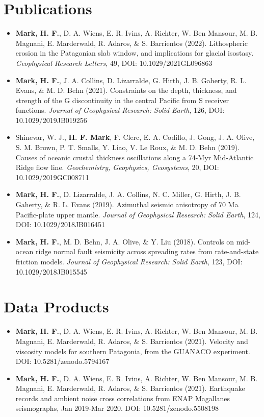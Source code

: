 \documentclass[letterpaper,11pt]{article}
\newlength\listindent
\newcommand{\resumeCite}[6]{
  \vspace{-2pt}\item 
    #1 (#2). #3. \textit{#4}, #5, DOI: #6
  \vspace{-5pt}
}
\newcommand{\resumeDataset}[4]{
  \vspace{-2pt}\item 
    #1 (#2). #3. DOI: #4
  \vspace{-5pt}
}
\newcommand{\resumeSubHeadingListStart}{\begin{itemize}[leftmargin=0.15in, label={}]}
\newcommand{\resumeSubHeadingListEnd}{\end{itemize}}
\begin{document}
\section{Publications}
    \resumeSubHeadingListStart
     0cm \linewidth \listindent \dimexpr\linewidth-\listindent\relax
    \resumeCite
    {\textbf{Mark, H. F.}, D. A. Wiens, E. R. Ivins, A. Richter, W. Ben Mansour, M. B. Magnani, E. Marderwald, R. Adaros, \& S. Barrientos}{2022}{Lithospheric erosion in the Patagonian slab window, and implications for glacial isostasy}{Geophysical Research Letters}{49}{10.1029/2021GL096863}
    \resumeCite
    {\textbf{Mark, H. F.}, J. A. Collins, D. Lizarralde, G. Hirth, J. B. Gaherty, R. L. Evans, \& M. D. Behn}{2021}{Constraints on the depth, thickness, and strength of the G discontinuity in the central Pacific from S receiver functions}{Journal of Geophysical Research: Solid Earth}{126}{10.1029/2019JB019256}
    \resumeCite
    {Shinevar, W. J., \textbf{H. F. Mark}, F. Clerc, E. A. Codillo, J. Gong, J. A. Olive, S. M. Brown, P. T. Smalls, Y. Liao, V. Le Roux, \& M. D. Behn}{2019}{Causes of oceanic crustal thickness oscillations along a 74-Myr Mid-Atlantic Ridge flow line}{Geochemistry, Geophysics, Geosystems}{20}{10.1029/2019GC008711}
    \resumeCite
    {\textbf{Mark, H. F.}, D. Lizarralde, J. A. Collins, N. C. Miller, G. Hirth, J. B. Gaherty, \& R. L. Evans}{2019}{Azimuthal seismic anisotropy of 70 Ma Pacific-plate upper mantle}{Journal of Geophysical Research: Solid Earth}{124}{10.1029/2018JB016451}
    \resumeCite
    {\textbf{Mark, H. F.}, M. D. Behn, J. A. Olive, \& Y. Liu}{2018}{Controls on mid-ocean ridge normal fault seismicity across spreading rates from rate-and-state friction models}{Journal of Geophysical Research: Solid Earth}{123}{10.1029/2018JB015545}
    \resumeSubHeadingListEnd

\section{Data Products}
   \resumeSubHeadingListStart
    0cm \linewidth \listindent \dimexpr\linewidth-\listindent\relax
   \resumeDataset
   {\textbf{Mark, H. F.}, D. A. Wiens, E. R. Ivins, A. Richter, W. Ben Mansour, M. B. Magnani, E. Marderwald, R. Adaros, \& S. Barrientos}{2021}{Velocity and viscosity models for southern Patagonia, from the GUANACO experiment}{10.5281/zenodo.5794167}
   \resumeDataset
   {\textbf{Mark, H. F.}, D. A. Wiens, E. R. Ivins, A. Richter, W. Ben Mansour, M. B. Magnani, E. Marderwald, R. Adaros, \& S. Barrientos}{2021}{Earthquake records and ambient noise cross correlations from ENAP Magallanes seismographs, Jan 2019-Mar 2020}{10.5281/zenodo.5508198}
    \resumeSubHeadingListEnd
\end{document}
